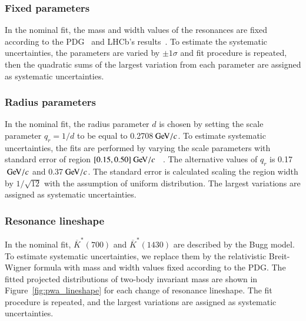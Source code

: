 \subsubsection{Fixed parameters}
In the nominal fit, the mass and width values of the resonances are fixed according to the PDG~\cite{Workman:2022ynf} and LHCb's results~\cite{LHCb:2022ouv}. To estimate the systematic uncertainties, the parameters are varied by $\pm 1\sigma$ and fit procedure is repeated, then the quadratic sums of the largest variation from each parameter are assigned as systematic uncertainties. 

\subsubsection{Radius parameters}
In the nominal fit, the radius parameter $d$ is chosen by setting the scale parameter $q_r = 1/d$ to be equal to 0.2708$\gev/c$. To estimate systematic uncertainties, the fits are performed by varying the scale parameters with standard error of region $[0.15, 0.50]\gev/c$ ~\cite{BESIII:2019dme}. The alternative values of $q_r$ is 0.17$\gev/c$ and 0.37$\gev/c$. The standard error is calculated scaling the region width by $1/\sqrt{12}$ with the assumption of uniform distribution. The largest variations are assigned as systematic uncertainties.

\subsubsection{Resonance lineshape}
In the nominal fit, $\overline{K}^*(700)$ and $\overline{K}^{*}(1430)$ are described by the Bugg model. To estimate systematic uncertainties, we replace them by the relativistic Breit-Wigner formula with mass and width values fixed according to the PDG. The fitted projected distributions of two-body invariant mass are shown in Figure~\ref{fig:pwa_lineshape} for each change of resonance lineshape. The fit procedure is repeated, and the largest variations are assigned as systematic uncertainties.

